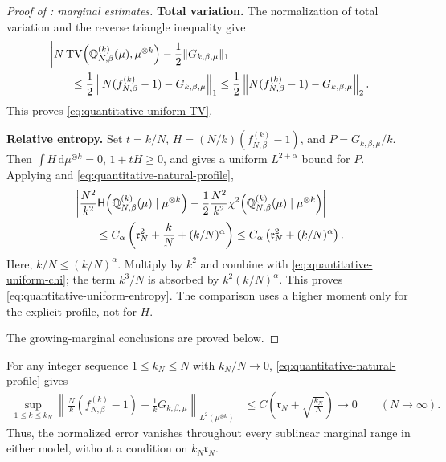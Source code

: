 \documentclass[11pt,reqno]{amsart}
\numberwithin{equation}{section}
\theoremstyle{plain}
\theoremstyle{remark}
\DeclarePairedDelimiter{\norm}{\lVert}{\rVert}
\newcommand{\md}{\mathrm{d}}
\newcommand{\Q}{{\mathbb{Q}}}
\newcommand{\Hr}{{\mathsf{H}}}
\newcommand{\be}{\beta}
\newcommand{\Chi}{\chi^2}
\newcommand{\TV}{\operatorname{TV}}
\newcommand{\step}[1]{\par\medskip\noindent\textbf{#1}}
\begin{document}
\begin{proof}[Proof of : marginal estimates]
\step{Total variation.}
The normalization of total variation and the reverse triangle inequality give
\begin{align}
 &\left|N\TV\!\left(\Q_{N,\be}^{(k)}(\mu),\mu^{\otimes k}\right)-\frac12\norm{G_{k,\be,\mu}}_1\right|\notag\\
 &\qquad\leq\frac12\left\|N(f_{N,\be}^{(k)}-1)-G_{k,\be,\mu}\right\|_1
 \leq\frac12\left\|N(f_{N,\be}^{(k)}-1)-G_{k,\be,\mu}\right\|_2.
 \label{eq:exact-TV-proof}
\end{align}
This proves \eqref{eq:quantitative-uniform-TV}.

\step{Relative entropy.}
Set $t=k/N$, $H=(N/k)(f_{N,\be}^{(k)}-1)$, and $P=G_{k,\be,\mu}/k$.  Then $\int H\,\md\mu^{\otimes k}=0$, $1+tH\geq0$, and  gives a uniform $L^{2+\alpha}$ bound for $P$.  Applying  and \eqref{eq:quantitative-natural-profile},
\begin{align}
 &\left|\frac{N^2}{k^2}\Hr\!\left(\Q_{N,\be}^{(k)}(\mu)\mid\mu^{\otimes k}\right)
 -\frac12\frac{N^2}{k^2}\Chi\!\left(\Q_{N,\be}^{(k)}(\mu)\mid\mu^{\otimes k}\right)\right|\notag\\
 &\qquad\leq C_\alpha\left(\mathfrak r_N^2+\frac{k}{N}+(k/N)^\alpha\right)
 \leq C_\alpha\left(\mathfrak r_N^2+(k/N)^\alpha\right).
 \label{eq:quantitative-entropy-chi-comparison}
\end{align}
Here, $k/N\leq(k/N)^\alpha$.  Multiply by $k^2$ and combine with \eqref{eq:quantitative-uniform-chi}; the term $k^3/N$ is absorbed by $k^2(k/N)^\alpha$.  This proves \eqref{eq:quantitative-uniform-entropy}.  The comparison uses a higher moment only for the explicit profile, not for $H$.

The growing-marginal conclusions are proved below.
\end{proof}

For any integer sequence $1\leq k_N\leq N$ with $k_N/N\to0$, \eqref{eq:quantitative-natural-profile} gives
\begin{align}
 \sup_{1\leq k\leq k_N}
 \left\|\frac Nk(f_{N,\be}^{(k)}-1)-\frac1kG_{k,\be,\mu}\right\|_{L^2(\mu^{\otimes k})}
 &\leq C\left(\mathfrak r_N+\sqrt{\frac{k_N}{N}}\right)
 \longrightarrow0\qquad(N\to\infty).
 \label{eq:profile-pass-natural-uniform-limit}
\end{align}
Thus, the normalized error vanishes throughout every sublinear marginal range in either model, without a condition on $k_N\mathfrak r_N$.

\end{document}
